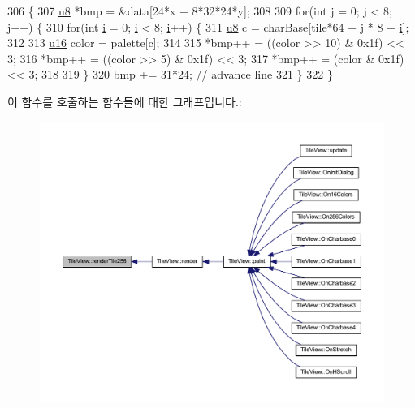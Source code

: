 \begin{DoxyCode}
306 \{
307   \mbox{\hyperlink{_system_8h_aed742c436da53c1080638ce6ef7d13de}{u8}} *bmp = &data[24*x + 8*32*24*y];
308 
309   \textcolor{keywordflow}{for}(\textcolor{keywordtype}{int} j = 0; j < 8; j++) \{
310     \textcolor{keywordflow}{for}(\textcolor{keywordtype}{int} \mbox{\hyperlink{expr-lex_8cpp_acb559820d9ca11295b4500f179ef6392}{i}} = 0; \mbox{\hyperlink{expr-lex_8cpp_acb559820d9ca11295b4500f179ef6392}{i}} < 8; \mbox{\hyperlink{expr-lex_8cpp_acb559820d9ca11295b4500f179ef6392}{i}}++) \{
311       \mbox{\hyperlink{_system_8h_aed742c436da53c1080638ce6ef7d13de}{u8}} c = charBase[tile*64 + j * 8 + \mbox{\hyperlink{expr-lex_8cpp_acb559820d9ca11295b4500f179ef6392}{i}}];
312 
313       \mbox{\hyperlink{_system_8h_a9e6c91d77e24643b888dbd1a1a590054}{u16}} color = palette[c];
314 
315       *bmp++ = ((color >> 10) & 0x1f) << 3;
316       *bmp++ = ((color >> 5) & 0x1f) << 3;
317       *bmp++ = (color & 0x1f) << 3;      
318 
319     \}
320     bmp += 31*24; \textcolor{comment}{// advance line}
321   \}
322 \}
\end{DoxyCode}
이 함수를 호출하는 함수들에 대한 그래프입니다.\+:
\nopagebreak
\begin{figure}[H]
\begin{center}
\leavevmode
\includegraphics[width=350pt]{class_tile_view_a1232e131b9ef993edea4390809c41814_icgraph}
\end{center}
\end{figure}
\mbox{\label{class_tile_view_aaea86e952981c5622d400ffb57b30480}} 
